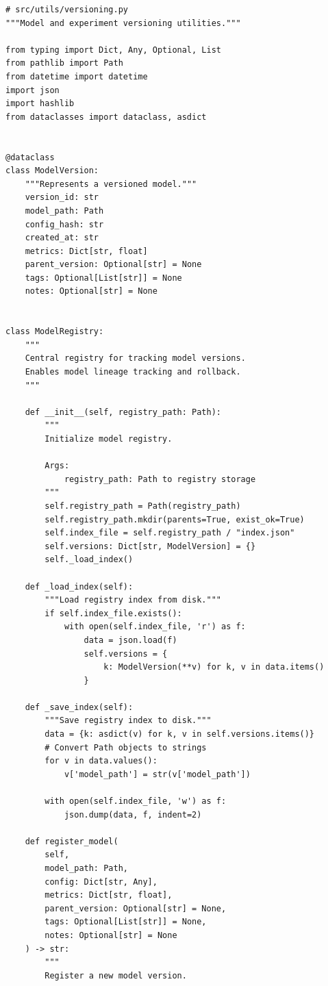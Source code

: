 \begin{lstlisting}[style=python, caption=Model versioning and experiment tracking]
# src/utils/versioning.py
"""Model and experiment versioning utilities."""

from typing import Dict, Any, Optional, List
from pathlib import Path
from datetime import datetime
import json
import hashlib
from dataclasses import dataclass, asdict


@dataclass
class ModelVersion:
    """Represents a versioned model."""
    version_id: str
    model_path: Path
    config_hash: str
    created_at: str
    metrics: Dict[str, float]
    parent_version: Optional[str] = None
    tags: Optional[List[str]] = None
    notes: Optional[str] = None


class ModelRegistry:
    """
    Central registry for tracking model versions.
    Enables model lineage tracking and rollback.
    """

    def __init__(self, registry_path: Path):
        """
        Initialize model registry.

        Args:
            registry_path: Path to registry storage
        """
        self.registry_path = Path(registry_path)
        self.registry_path.mkdir(parents=True, exist_ok=True)
        self.index_file = self.registry_path / "index.json"
        self.versions: Dict[str, ModelVersion] = {}
        self._load_index()

    def _load_index(self):
        """Load registry index from disk."""
        if self.index_file.exists():
            with open(self.index_file, 'r') as f:
                data = json.load(f)
                self.versions = {
                    k: ModelVersion(**v) for k, v in data.items()
                }

    def _save_index(self):
        """Save registry index to disk."""
        data = {k: asdict(v) for k, v in self.versions.items()}
        # Convert Path objects to strings
        for v in data.values():
            v['model_path'] = str(v['model_path'])

        with open(self.index_file, 'w') as f:
            json.dump(data, f, indent=2)

    def register_model(
        self,
        model_path: Path,
        config: Dict[str, Any],
        metrics: Dict[str, float],
        parent_version: Optional[str] = None,
        tags: Optional[List[str]] = None,
        notes: Optional[str] = None
    ) -> str:
        """
        Register a new model version.


\end{lstlisting}

